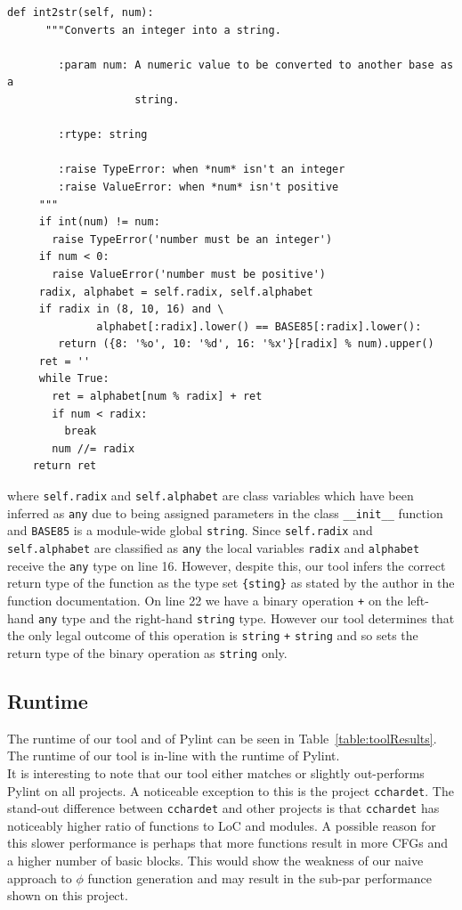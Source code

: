 \documentclass[12pt, titlepage]{article}
\begin{document}
\begin{lstlisting}[mathescape]
    def int2str(self, num):
      """Converts an integer into a string.

        :param num: A numeric value to be converted to another base as a
                    string.

        :rtype: string

        :raise TypeError: when *num* isn't an integer
        :raise ValueError: when *num* isn't positive
     """
     if int(num) != num:
       raise TypeError('number must be an integer')
     if num < 0:
       raise ValueError('number must be positive')
     radix, alphabet = self.radix, self.alphabet
     if radix in (8, 10, 16) and \
              alphabet[:radix].lower() == BASE85[:radix].lower():
        return ({8: '%o', 10: '%d', 16: '%x'}[radix] % num).upper()
     ret = ''
     while True:
       ret = alphabet[num % radix] + ret
       if num < radix:
         break
       num //= radix
    return ret
\end{lstlisting}
where \texttt{self.radix} and \texttt{self.alphabet} are class variables which have been inferred as \texttt{any} due to being assigned parameters in the class \texttt{\_\_init\_\_} function and \texttt{BASE85} is a module-wide global \texttt{string}. Since \texttt{self.radix} and \texttt{self.alphabet} are classified as \texttt{any} the local variables \texttt{radix} and \texttt{alphabet} receive the \texttt{any} type on line 16. However, despite this, our tool infers the correct return type of the function as the type set \texttt{\{sting\}} as stated by the author in the function documentation. On line 22 we have a binary operation \texttt{+} on the left-hand \texttt{any} type and the right-hand \texttt{string} type. However our tool determines that the only legal outcome of this operation is \texttt{string} \texttt{+} \texttt{string} and so sets the return type of the binary operation as \texttt{string} only.

\subsection{Runtime}
The runtime of our tool and of Pylint can be seen in Table~\ref{table:toolResults}. The runtime of our tool is in-line with the runtime of Pylint. \\
\indent It is interesting to note that our tool either matches or slightly out-performs Pylint on all projects. A noticeable exception to this is the project \texttt{cchardet}. The stand-out difference between \texttt{cchardet} and other projects is that \texttt{cchardet} has noticeably higher ratio of functions to LoC and modules. A possible reason for this slower performance is perhaps that more functions result in more CFGs and a higher number of basic blocks. This would show the weakness of our naive approach to $\phi$ function generation and may result in the sub-par performance shown on this project.
\end{document}
